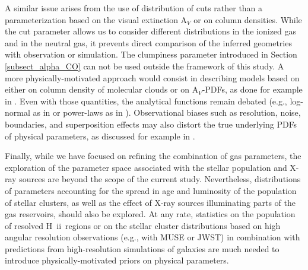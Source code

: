 \documentclass{aa}
\newcommand{\hii}{H~{\sc ii}}
\begin{document}
A similar issue arises from the use of distribution of cuts rather than a parameterization based on the visual extinction A$_V$ or on column densities. While the cut parameter allows us to consider different distributions in the ionized gas and in the neutral gas, it prevents direct comparison of the inferred geometries with observation or simulation. The clumpiness parameter introduced in Section \ref{subsect_alpha_CO} can not be used outside the framework of this study. A more physically-motivated approach would consist in describing models based on either on column density of molecular clouds or on A$_V$-PDFs, as done for example in \cite{Bisbas_2019, Bisbas_2023}. Even with those quantities, the analytical functions remain debated (e.g., log-normal as in \cite{Bisbas_2019, Bisbas_2023} or power-laws as in \cite{Brunt_2015, Lombardi_2015}). Observational biases such as resolution, noise, boundaries, and superposition effects may also distort the true underlying PDFs of physical parameters, as discussed for example in \cite{Lombardi_2015}. 

Finally, while we have focused on refining the combination of gas parameters, the exploration of the parameter space associated with the stellar population and X-ray sources are beyond the scope of the current study. Nevertheless, distributions of parameters accounting for the spread in age and luminosity of the population of stellar clusters, as well as the effect of X-ray sources illuminating parts of the gas reservoirs, should also be explored. At any rate, statistics on the population of resolved \hii\ regions or on the stellar cluster distributions based on high angular resolution observations (e.g., with MUSE or JWST) in combination with predictions from high-resolution simulations of galaxies are much needed to introduce physically-motivated priors on physical parameters.
\end{document}
